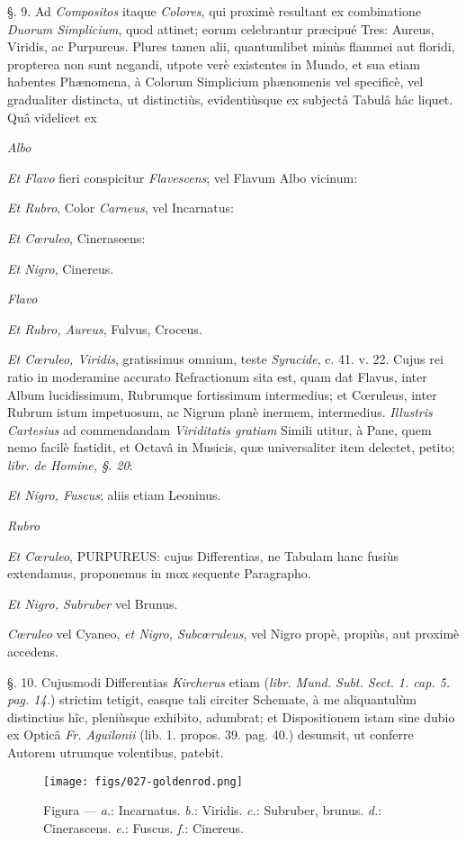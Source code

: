 \documentclass[a4paper, 11pt, oneside, polutonikogreek, german]{article}
\begin{document}
§. 9. Ad \emph{Compositos} itaque \emph{Colores}, qui proximè resultant ex combinatione \emph{Duorum Simplicium}, quod attinet; eorum celebrantur præcipué Tres: Aureus, Viridis, ac Purpureus. Plures tamen alii, quantumlibet minùs flammei aut floridi, propterea non sunt negandi, utpote verè existentes in Mundo, et sua etiam habentes Phænomena, à Colorum Simplicium phænomenis vel specificè, vel gradualiter distincta, ut distinctiùs, evidentiùsque ex subjectâ Tabulâ hâc liquet. Quâ videlicet ex

\emph{Albo}

\emph{Et Flavo} fieri conspicitur \emph{Flavescens}; vel Flavum Albo vicinum:

\emph{Et Rubro}, Color \emph{Carneus}, vel Incarnatus:

\emph{Et Cœruleo}, Cineraseens:

\emph{Et Nigro}, Cinereus.

\emph{Flavo}

\emph{Et Rubro, Aureus}, Fulvus, Croceus.

\emph{Et Cœruleo, Viridis}, gratissimus omnium, teste \emph{Syracide}, c. 41. v. 22. Cujus rei ratio in moderamine accurato Refractionum sita est, quam dat Flavus, inter Album lucidissimum, Rubrumque fortissimum intermedius; et Cœruleus, inter Rubrum istum impetuosum, ac Nigrum planè inermem, intermedius. \emph{Illustris Cartesius} ad commendandam \emph{Viriditatis gratiam} Simili utitur, à Pane, quem nemo facilè fastidit, et Octavâ in Musicis, quæ universaliter item delectet, petito; \emph{libr. de Homine, §. 20}:

\emph{Et Nigro, Fuscus}; aliis etiam Leoninus.

\emph{Rubro}

\emph{Et Cœruleo}, PURPUREUS: cujus Differentias, ne Tabulam hanc fusiùs extendamus, proponemus in mox sequente Paragrapho.

\emph{Et Nigro, Subruber} vel Brunus.

\emph{Cœruleo} vel Cyaneo, \emph{et Nigro, Subcœruleus}, vel Nigro propè, propiùs, aut proximè accedens.

§. 10. Cujusmodi Differentias \emph{Kircherus} etiam (\emph{libr. Mund. Subt. Sect. 1. cap. 5. pag. 14.}) strictim tetigit, easque tali circiter Schemate, à me aliquantulùm distinctius hîc, pleniùsque exhibito, adumbrat; et Dispositionem istam sine dubio ex Opticâ \emph{Fr. Aguilonii} (lib. 1. propos. 39. pag. 40.) desumsit, ut conferre Autorem utrumque volentibus, patebit.

\begin{figure}[H]
\centering
\texttt{[image: figs/027-goldenrod.png]}
\caption{Figura --- \emph{a.}: Incarnatus. \emph{b.}: Viridis. \emph{c.}: Subruber, brunus. \emph{d.}: Cinerascens. \emph{e.}: Fuscus. \emph{f.}: Cinereus.}
\end{figure}
\end{document}
